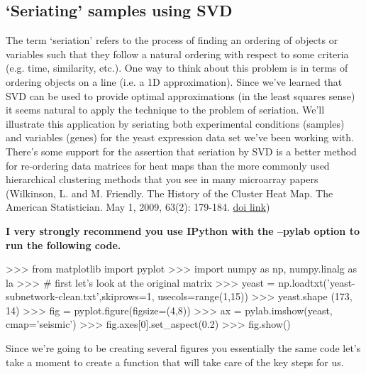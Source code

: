 \documentclass[11pt,letterpaper]{article}
\begin{document}
\subsection*{`Seriating' samples using SVD}

The term `seriation' refers to the process of finding an ordering of objects or variables such that they follow a natural ordering with respect to some criteria (e.g. time, similarity, etc.). One way to think about this problem is in terms of ordering objects on a line (i.e. a 1D approximation).  Since we've learned that SVD can be used to provide optimal approximations (in the least squares sense) it seems natural to apply the technique to the problem of seriation. We'll illustrate this application by seriating both experimental conditions (samples) and variables (genes) for the yeast expression data set we've been working with.  There's some support for the assertion that seriation by SVD is a better method for re-ordering data matrices for heat maps than the more commonly used hierarchical clustering methods that you see in many microarray papers (Wilkinson, L. and M. Friendly. The History of the Cluster Heat Map. The American Statistician. May 1, 2009, 63(2): 179-184. \href{http://dx.doi.org/10.1198/tas.2009.0033}{doi link}) 

{\color{red} \bfseries I very strongly recommend you use IPython with the --pylab option to run the following code.}

\begin{Pcode}
>>> from matplotlib import pyplot
>>> import numpy as np, numpy.linalg as la
>>> # first let's look at the original matrix
>>> yeast = np.loadtxt('yeast-subnetwork-clean.txt',skiprows=1, usecols=range(1,15))
>>> yeast.shape
(173, 14)
>>> fig = pyplot.figure(figsize=(4,8))
>>> ax = pylab.imshow(yeast, cmap='seismic')
>>> fig.axes[0].set_aspect(0.2)
>>> fig.show() 
\end{Pcode}

Since we're going to be creating several figures you essentially the same code let's take a moment to create a function that will take care of the key steps for us.
\end{document}
